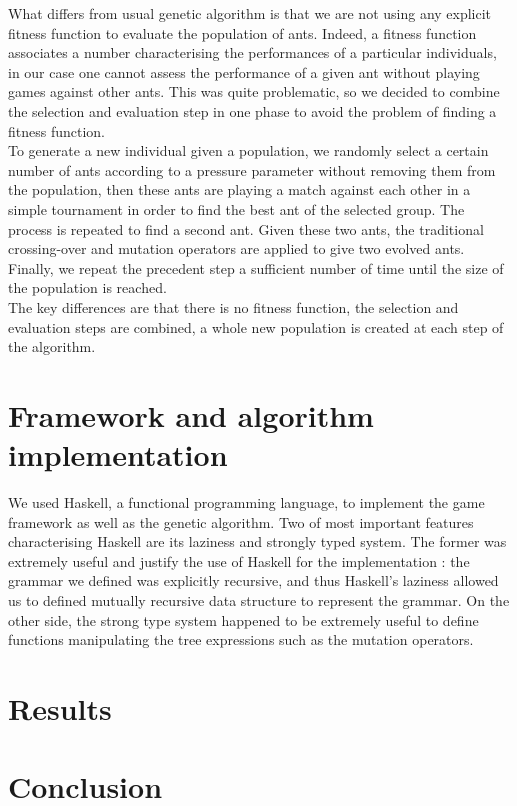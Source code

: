 \documentclass[10pt,a4paper]{article}
\begin{document}
What differs from usual genetic algorithm is that we are not using any
explicit fitness function to evaluate the population of ants. Indeed,
a fitness function associates a number characterising the performances
of a particular individuals, in our case one cannot assess the
performance of a given ant without playing games against other
ants. This was quite problematic, so we decided to combine the
selection and evaluation step in one phase to avoid the problem of
finding a fitness function.\\

To generate a new individual given a population, we randomly select a
certain number of ants according to a pressure parameter without
removing them from the population, then these ants are playing a match
against each other in a simple tournament in order to find the best
ant of the selected group. The process is repeated to find a second
ant. Given these two ants, the traditional crossing-over and mutation
operators are applied to give two evolved ants. Finally, we repeat
the precedent step a sufficient number of time until the size of the
population is reached.\\

The key differences are that there is no fitness function, the
selection and evaluation steps are combined, a whole new population is
created at each step of the algorithm.\\

\section{Framework and algorithm implementation}

We used Haskell, a functional programming language, to implement the
game framework as well as the genetic algorithm. Two of most important
features characterising Haskell are its laziness and strongly typed
system. The former was extremely useful and justify the use of Haskell
for the implementation : the grammar we defined was explicitly
recursive, and thus Haskell's laziness allowed us to defined mutually
recursive data structure to represent the grammar. On the other side,
the strong type system happened to be extremely useful to define
functions manipulating the tree expressions such as the mutation
operators.

\section{Results}

\section*{Conclusion}
\end{document}
